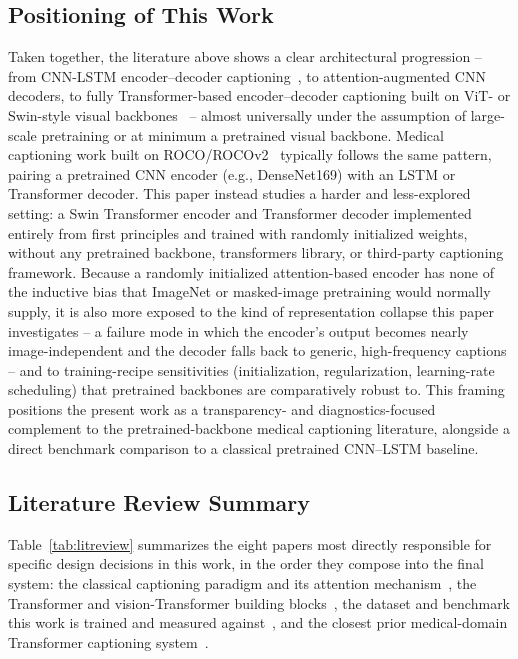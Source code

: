 \documentclass[conference]{IEEEtran}
\begin{document}
\subsection{Positioning of This Work}
Taken together, the literature above shows a clear architectural progression -- from CNN-LSTM encoder--decoder captioning~\cite{vinyals2015show,xu2015show,ijraset2022}, to attention-augmented CNN decoders, to fully Transformer-based encoder--decoder captioning built on ViT- or Swin-style visual backbones~\cite{dosovitskiy2020vit,liu2021swin,lee2022cross,fadhilah2026transformer} -- almost universally under the assumption of large-scale pretraining or at minimum a pretrained visual backbone. Medical captioning work built on ROCO/ROCOv2~\cite{pelka2018roco,ruckert2024rocov2,ruckert2023imageclef} typically follows the same pattern, pairing a pretrained CNN encoder (e.g., DenseNet169) with an LSTM or Transformer decoder. This paper instead studies a harder and less-explored setting: a Swin Transformer encoder and Transformer decoder implemented entirely from first principles and trained with randomly initialized weights, without any pretrained backbone, transformers library, or third-party captioning framework. Because a randomly initialized attention-based encoder has none of the inductive bias that ImageNet or masked-image pretraining would normally supply, it is also more exposed to the kind of representation collapse this paper investigates -- a failure mode in which the encoder's output becomes nearly image-independent and the decoder falls back to generic, high-frequency captions -- and to training-recipe sensitivities (initialization, regularization, learning-rate scheduling) that pretrained backbones are comparatively robust to. This framing positions the present work as a transparency- and diagnostics-focused complement to the pretrained-backbone medical captioning literature, alongside a direct benchmark comparison to a classical pretrained CNN--LSTM baseline.

\subsection{Literature Review Summary}
\label{sec:related-summary}

Table~\ref{tab:litreview} summarizes the eight papers most directly responsible for specific design decisions in this work, in the order they compose into the final system: the classical captioning paradigm and its attention mechanism~\cite{vinyals2015show,xu2015show}, the Transformer and vision-Transformer building blocks~\cite{vaswani2017attention,dosovitskiy2020vit,liu2021swin}, the dataset and benchmark this work is trained and measured against~\cite{ruckert2024rocov2,ruckert2023imageclef}, and the closest prior medical-domain Transformer captioning system~\cite{lee2022cross}.
\end{document}

